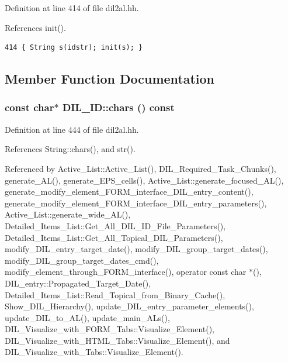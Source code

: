 Definition at line 414 of file dil2al.hh.

References init().



\footnotesize\begin{verbatim}414 { String s(idstr); init(s); }
\end{verbatim}\normalsize 


\subsection{Member Function Documentation}
\subsubsection{\setlength{\rightskip}{0pt plus 5cm}const char$\ast$ DIL\_\-ID::chars () const\hspace{0.3cm}{\tt  [inline]}}\label{classDIL__ID_a15}




Definition at line 444 of file dil2al.hh.

References String::chars(), and str().

Referenced by Active\_\-List::Active\_\-List(), DIL\_\-Required\_\-Task\_\-Chunks(), generate\_\-AL(), generate\_\-EPS\_\-cells(), Active\_\-List::generate\_\-focused\_\-AL(), generate\_\-modify\_\-element\_\-FORM\_\-interface\_\-DIL\_\-entry\_\-content(), generate\_\-modify\_\-element\_\-FORM\_\-interface\_\-DIL\_\-entry\_\-parameters(), Active\_\-List::generate\_\-wide\_\-AL(), Detailed\_\-Items\_\-List::Get\_\-All\_\-DIL\_\-ID\_\-File\_\-Parameters(), Detailed\_\-Items\_\-List::Get\_\-All\_\-Topical\_\-DIL\_\-Parameters(), modify\_\-DIL\_\-entry\_\-target\_\-date(), modify\_\-DIL\_\-group\_\-target\_\-dates(), modify\_\-DIL\_\-group\_\-target\_\-dates\_\-cmd(), modify\_\-element\_\-through\_\-FORM\_\-interface(), operator const char $\ast$(), DIL\_\-entry::Propagated\_\-Target\_\-Date(), Detailed\_\-Items\_\-List::Read\_\-Topical\_\-from\_\-Binary\_\-Cache(), Show\_\-DIL\_\-Hierarchy(), update\_\-DIL\_\-entry\_\-parameter\_\-elements(), update\_\-DIL\_\-to\_\-AL(), update\_\-main\_\-ALs(), DIL\_\-Visualize\_\-with\_\-FORM\_\-Tabs::Visualize\_\-Element(), DIL\_\-Visualize\_\-with\_\-HTML\_\-Tabs::Visualize\_\-Element(), and DIL\_\-Visualize\_\-with\_\-Tabs::Visualize\_\-Element().



